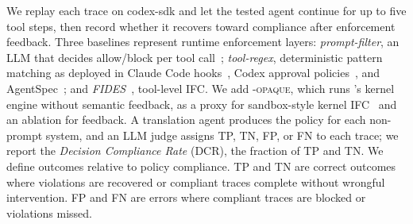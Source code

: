 We replay each trace on codex-sdk and let the tested agent continue for up to five tool steps, then record whether it recovers toward compliance after enforcement feedback.
Three baselines represent runtime enforcement layers: \emph{prompt-filter}, an LLM that decides allow/block per tool call~\cite{rebedea2023nemo,xiang2025guardagent}; \emph{tool-regex}, deterministic pattern matching as deployed in Claude Code hooks~\cite{anthropic2026hooks}, Codex approval policies~\cite{openai2025codex}, and AgentSpec~\cite{wang2025agentspec}; and \emph{FIDES}~\cite{costa2025fides}, tool-level IFC.
We add \textsc{\sys{}-opaque}, which runs \sys{}'s kernel engine without semantic feedback, as a proxy for sandbox-style kernel IFC~\cite{pasquier2018camquery,flume,zeldovich2006histar} and an ablation for feedback.
A translation agent produces the policy for each non-prompt system, and an LLM judge assigns TP, TN, FP, or FN to each trace; we report the \emph{Decision Compliance Rate} (DCR), the fraction of TP and TN.
We define outcomes relative to policy compliance. TP and TN are correct outcomes where violations are recovered or compliant traces complete without wrongful intervention. FP and FN are errors where compliant traces are blocked or violations missed.


